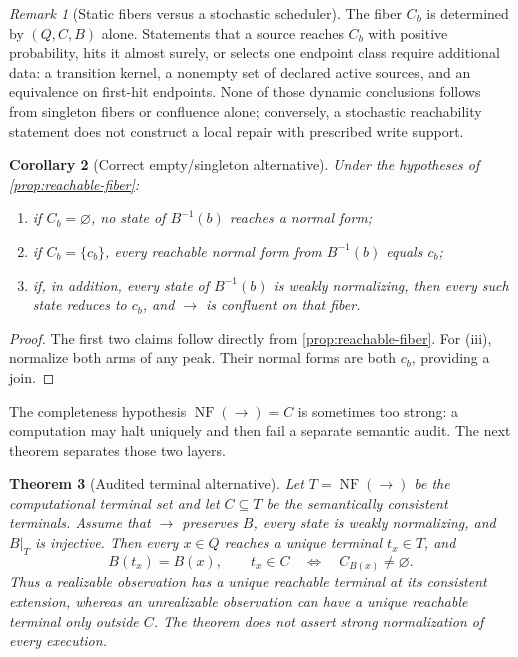 \documentclass[11pt]{article}
\newtheorem{theorem}{Theorem}[section]
\newtheorem{corollary}[theorem]{Corollary}
\theoremstyle{definition}
\theoremstyle{remark}
\newtheorem{remark}[theorem]{Remark}
\numberwithin{equation}{section}
\newcommand{\NF}{\operatorname{NF}}
\begin{document}
\begin{remark}[Static fibers versus a stochastic scheduler]
The fiber $C_b$ is determined by $(Q,C,B)$ alone.  Statements that a source
reaches $C_b$ with positive probability, hits it almost surely, or selects one
endpoint class require additional data: a transition kernel, a nonempty set of
declared active sources, and an equivalence on first-hit endpoints.  None of
those dynamic conclusions follows from singleton fibers or confluence alone;
conversely, a stochastic reachability statement does not construct a local
repair with prescribed write support.
\end{remark}

\begin{corollary}[Correct empty/singleton alternative]\label{cor:empty-singleton}
Under the hypotheses of \cref{prop:reachable-fiber}:
\begin{enumerate}[label=(\roman*)]
\item if $C_b=\varnothing$, no state of $B^{-1}(b)$ reaches a normal form;
\item if $C_b=\{c_b\}$, every reachable normal form from $B^{-1}(b)$ equals $c_b$;
\item if, in addition, every state of $B^{-1}(b)$ is weakly normalizing, then every such state reduces to $c_b$, and $\to$ is confluent on that fiber.
\end{enumerate}
\end{corollary}

\begin{proof}
The first two claims follow directly from \cref{prop:reachable-fiber}.  For (iii), normalize both arms of any peak.  Their normal forms are both $c_b$, providing a join.
\end{proof}

The completeness hypothesis $\NF(\to)=C$ is sometimes too strong: a
computation may halt uniquely and then fail a separate semantic audit.  The
next theorem separates those two layers.

\begin{theorem}[Audited terminal alternative]\label{thm:audited-terminal}
Let $T=\NF(\to)$ be the computational terminal set and let $C\subseteq T$
be the semantically consistent terminals.  Assume that $\to$ preserves $B$,
every state is weakly normalizing, and $B|_T$ is injective.  Then every
$x\in Q$ reaches a unique terminal $t_x\in T$, and
\[
 B(t_x)=B(x),
 \qquad
 t_x\in C
 \quad\Longleftrightarrow\quad
 C_{B(x)}\ne\varnothing.
\]
Thus a realizable observation has a unique reachable terminal at its
consistent extension, whereas an unrealizable observation can have a
unique reachable terminal only outside $C$.  The theorem does not assert
strong normalization of every execution.
\end{theorem}
\end{document}

